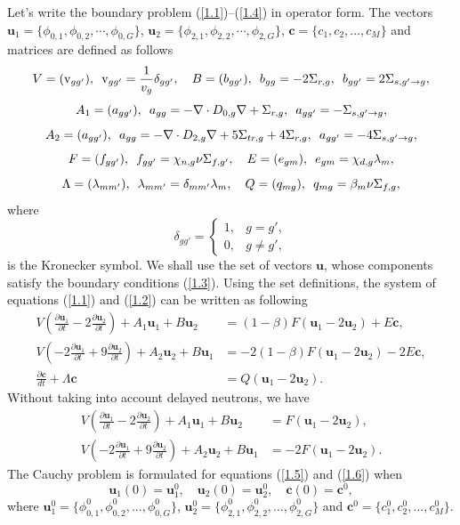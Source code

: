 \documentclass[authoryear]{elsarticle}
\begin{document}
Let's write the boundary problem (\ref{1.1})--(\ref{1.4}) in operator form. 
The vectors $\bm u_1 = \{\phi_{0,1}, \phi_{0,2}, \cdots, \phi_{0,G}\}$, $\bm u_2 = \{\phi_{2,1}, \phi_{2,2}, \cdots, \phi_{2,G}\}$, $\bm c = \{c_1, c_2, ..., c_M\}$ and matrices are defined as follows
\[
V = (\mathrm{v}_{gg'}),
\enskip
\mathrm{v}_{gg'} = \frac{1}{v_g} \delta_{gg'},
\quad
B = (b_{gg'}),
\enskip
b_{gg} = -2\Sigma_{r,g},
\enskip
b_{gg'} = 2\Sigma_{s, g' \rightarrow g},
\]
\[
A_1 = (a_{gg'}),
\enskip
a_{gg} = -\nabla \cdot D_{0,g} \nabla + \Sigma_{r,g},
\enskip
a_{gg'} = -\Sigma_{s, g' \rightarrow g},
\]
\[
A_2 = (a_{gg'}),
\enskip
a_{gg} = -\nabla \cdot D_{2,g} \nabla + 5\Sigma_{tr,g} + 4\Sigma_{r,g},
\enskip
a_{gg'} = -4\Sigma_{s, g' \rightarrow g},
\]
\[
F = (f_{gg'}),
\enskip
f_{gg'} = \chi_{n,g}\nu\Sigma_{f,g'},
\quad
E =(e_{gm}),
\enskip
e_{gm} = \chi_{d,g}\lambda_m,
\]
\[
\Lambda = (\lambda_{mm'}), 
\enskip
\lambda_{mm'} = \delta_{mm'}\lambda_m,
\quad
Q = (q_{mg}),
\enskip
q_{mg} =\beta_m \nu\Sigma_{f,g},
\]
where
\[
 \delta_{g g'} = \left \{ 
 \begin{matrix}
 1, & g = g', \\
 0, & g \neq  g',
 \end{matrix}
 \right. 
\]  
is the Kronecker symbol.
We shall use the set of vectors $\bm u$, whose components satisfy the boundary conditions (\ref{1.3}). 
Using the set definitions, the system of equations (\ref{1.1}) and (\ref{1.2}) can be written as following
\begin{equation}\label{1.5}
\begin{split}
V (\frac{\partial \bm u_1}{\partial t} - 2 \frac{\partial \bm u_2}{\partial t}) + A_1 \bm u_1 + B \bm u_2 &=(1-\beta) F (\bm u_1 - 2\bm u_2) + E\bm c,
\\
V(- 2 \frac{\partial \bm u_1}{\partial t} + 9 \frac{\partial \bm u_2}{\partial t} ) + A_2 \bm u_2 + B \bm u_1 &=-2(1-\beta) F (\bm u_1 - 2\bm u_2) - 2E\bm c,
\\
\frac{\partial \bm c}{d t} + \Lambda \bm c &= Q (\bm u_1 - 2\bm u_2). 
\end{split}
\end{equation}
Without taking into account delayed neutrons, we have
\begin{equation}\label{1.6}
\begin{split}
V (\frac{\partial \bm u_1}{\partial t} - 2 \frac{\partial \bm u_2}{\partial t}) + A_1 \bm u_1 + B \bm u_2 &= F (\bm u_1 - 2\bm u_2),
\\
V( - 2 \frac{\partial \bm u_1}{\partial t} + 9 \frac{\partial \bm u_2}{\partial t}) + A_2 \bm u_2 + B \bm u_1 &=-2 F (\bm u_1 - 2\bm u_2).
\end{split}
\end{equation}
The Cauchy problem is formulated for equations (\ref{1.5}) and (\ref{1.6}) when
\begin{equation}\label{1.7}
 \bm u_1(0) = \bm u_1^0, \quad  \bm u_2(0) = \bm u_2^0, \quad \bm c(0) = \bm c^0,
\end{equation} 
where $\bm u_1^0 = \{\phi_{0,1}^0,  \phi_{0,2}^0, ...,  \phi_{0,G}^0 \}$, 
$\bm u_2^0 = \{\phi_{2,1}^0,  \phi_{2,2}^0, ...,  \phi_{2,G}^0 \}$ and 
$\bm c^0 = \{ c_1^0,  c_2^0, ...,  c_M^0 \}$.
\end{document}
